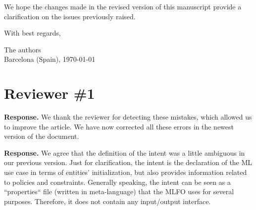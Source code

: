 \documentclass[a4paper,twoside,11pt]{reviewresponse}
\newenvironment{bottompar}{\par\vspace*{\fill}}{\clearpage}
\begin{document}
    We hope the changes made in the revised version of this manuscript provide a clarification on the issues previously raised.  
    
    With best regards,
   	\begin{bottompar}
		\begin{flushright}
			The authors\\
			Barcelona (Spain), \today
		\end{flushright}
	\end{bottompar}
	
	
	\section{Reviewer \#1}
	
%
		
	
	\textbf{Response.} We thank the reviewer for detecting these mistakes, which allowed us to improve the article. We have now corrected all these errors in the newest version of the document.
	
	
	\textbf{Response.} We agree that the definition of the intent was a little ambiguous in our previous version. Just for clarification, the intent is the declaration of the ML use case in terms of entities' initialization, but also provides information related to policies and constraints. Generally speaking, the intent can be seen as a “properties“ file (written in meta-language) that the MLFO uses for several purposes. Therefore, it does not contain any input/output interface.
	
\end{document}
